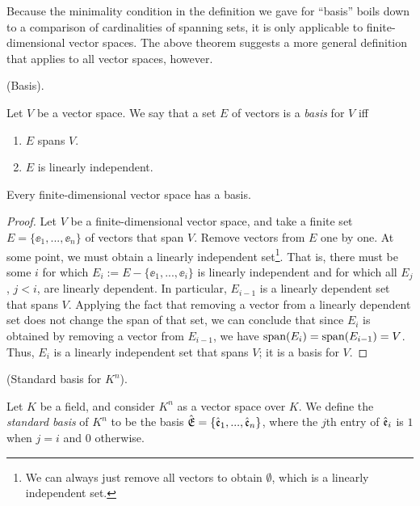 Because the minimality condition in the definition we gave for ``basis'' boils down to a comparison of cardinalities of spanning sets, it is only applicable to finite-dimensional vector spaces. The above theorem suggests a more general definition that applies to all vector spaces, however.

\begin{defn}
    (Basis).
    
    Let $V$ be a vector space. We say that a set $E$ of vectors is a \textit{basis} for $V$ iff
   
   \begin{enumerate}
        \item $E$ spans $V$.
        \item $E$ is linearly independent.
    \end{enumerate}
\end{defn}

\begin{theorem}
    Every finite-dimensional vector space has a basis.
\end{theorem}

\begin{proof}
    Let $V$ be a finite-dimensional vector space, and take a finite set $E = \{\ee_1, ..., \ee_n\}$ of vectors that span $V$. Remove vectors from $E$ one by one. At some point, we must obtain a linearly independent set\footnote{We can always just remove all vectors to obtain $\emptyset$, which is a linearly independent set.}. That is, there must be some $i$ for which $E_i := E - \{\ee_1, ..., \ee_i\}$ is linearly independent and for which all $E_j$, $j < i$, are linearly dependent. In particular, $E_{i - 1}$ is a linearly dependent set that spans $V$. Applying the fact that removing a vector from a linearly dependent set does not change the span of that set, we can conclude that since $E_i$ is obtained by removing a vector from $E_{i - 1}$, we have $\text{span}(E_i) = \text{span}(E_{i - 1}) = V$. Thus, $E_i$ is a linearly independent set that spans $V$; it is a basis for $V$.
\end{proof}

\begin{defn}
    (Standard basis for $K^n$).
    
    Let $K$ be a field, and consider $K^n$ as a vector space over $K$. We define the \textit{standard basis} of $K^n$ to be the basis ${\hat{\mathfrak{E}}} = \{\hat{\mathfrak{e}}_1, ..., \hat{\mathfrak{e}}_n\}$, where the $j$th entry of $\hat{\mathfrak{e}}_i$ is $1$ when $j = i$ and $0$ otherwise.
\end{defn}

